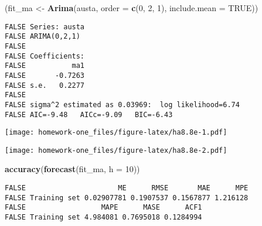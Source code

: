 \documentclass[openany]{book}
\newenvironment{Shaded}{\begin{snugshade}}{\end{snugshade}}
\newcommand{\DataTypeTok}[1]{\textcolor[rgb]{0.13,0.29,0.53}{#1}}
\newcommand{\DecValTok}[1]{\textcolor[rgb]{0.00,0.00,0.81}{#1}}
\newcommand{\KeywordTok}[1]{\textcolor[rgb]{0.13,0.29,0.53}{\textbf{#1}}}
\newcommand{\NormalTok}[1]{#1}
\newcommand{\OperatorTok}[1]{\textcolor[rgb]{0.81,0.36,0.00}{\textbf{#1}}}
\newcommand{\OtherTok}[1]{\textcolor[rgb]{0.56,0.35,0.01}{#1}}
\newcommand{\StringTok}[1]{\textcolor[rgb]{0.31,0.60,0.02}{#1}}
\begin{document}
\begin{Shaded}
\begin{Highlighting}[]
\NormalTok{(fit_ma <-}\StringTok{ }\KeywordTok{Arima}\NormalTok{(austa, }\DataTypeTok{order =} \KeywordTok{c}\NormalTok{(}\DecValTok{0}\NormalTok{, }\DecValTok{2}\NormalTok{, }\DecValTok{1}\NormalTok{), }\DataTypeTok{include.mean =} \OtherTok{TRUE}\NormalTok{))}
\end{Highlighting}
\end{Shaded}

\begin{verbatim}
FALSE Series: austa 
FALSE ARIMA(0,2,1) 
FALSE 
FALSE Coefficients:
FALSE           ma1
FALSE       -0.7263
FALSE s.e.   0.2277
FALSE 
FALSE sigma^2 estimated as 0.03969:  log likelihood=6.74
FALSE AIC=-9.48   AICc=-9.09   BIC=-6.43
\end{verbatim}

\begin{Shaded}
\end{Shaded}

\texttt{[image: homework-one\_files/figure-latex/ha8.8e-1.pdf]}

\begin{Shaded}
\end{Shaded}

\texttt{[image: homework-one\_files/figure-latex/ha8.8e-2.pdf]}

\begin{Shaded}
\begin{Highlighting}[]
\KeywordTok{accuracy}\NormalTok{(}\KeywordTok{forecast}\NormalTok{(fit_ma, }\DataTypeTok{h =} \DecValTok{10}\NormalTok{))}
\end{Highlighting}
\end{Shaded}

\begin{verbatim}
FALSE                      ME      RMSE       MAE      MPE
FALSE Training set 0.02907781 0.1907537 0.1567877 1.216128
FALSE                  MAPE      MASE      ACF1
FALSE Training set 4.984081 0.7695018 0.1284994
\end{verbatim}
\end{document}
